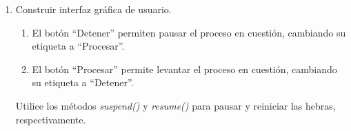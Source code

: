 \documentclass[10pt]{article}
\begin{document}
\begin{enumerate}
    \begin{enumerate}[label=(\alph*)]
		\item Construir interfaz gr\'afica de usuario. 
        \begin{enumerate}
		\item El bot\'on ``Detener'' permiten pausar el proceso en cuesti\'on, cambiando su etiqueta a ``Procesar''. 
		\item El bot\'on ``Procesar'' permite levantar el proceso en cuesti\'on, cambiando su etiqueta a ``Detener''.
		\end{enumerate}
		Utilice los m\'etodos \emph{suspend()} y \emph{resume()} para pausar y reiniciar las hebras, respectivamente.
	\end{enumerate}

	\end{enumerate}
\end{document}

